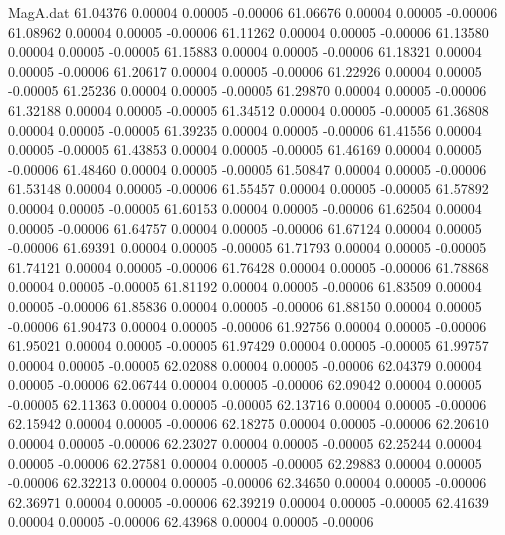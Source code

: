 \begin{filecontents}{MagA.dat}
  61.04376    0.00004    0.00005   -0.00006
  61.06676    0.00004    0.00005   -0.00006
  61.08962    0.00004    0.00005   -0.00006
  61.11262    0.00004    0.00005   -0.00006
  61.13580    0.00004    0.00005   -0.00005
  61.15883    0.00004    0.00005   -0.00006
  61.18321    0.00004    0.00005   -0.00006
  61.20617    0.00004    0.00005   -0.00006
  61.22926    0.00004    0.00005   -0.00005
  61.25236    0.00004    0.00005   -0.00005
  61.29870    0.00004    0.00005   -0.00006
  61.32188    0.00004    0.00005   -0.00005
  61.34512    0.00004    0.00005   -0.00005
  61.36808    0.00004    0.00005   -0.00005
  61.39235    0.00004    0.00005   -0.00006
  61.41556    0.00004    0.00005   -0.00005
  61.43853    0.00004    0.00005   -0.00005
  61.46169    0.00004    0.00005   -0.00006
  61.48460    0.00004    0.00005   -0.00005
  61.50847    0.00004    0.00005   -0.00006
  61.53148    0.00004    0.00005   -0.00006
  61.55457    0.00004    0.00005   -0.00005
  61.57892    0.00004    0.00005   -0.00005
  61.60153    0.00004    0.00005   -0.00006
  61.62504    0.00004    0.00005   -0.00006
  61.64757    0.00004    0.00005   -0.00006
  61.67124    0.00004    0.00005   -0.00006
  61.69391    0.00004    0.00005   -0.00005
  61.71793    0.00004    0.00005   -0.00005
  61.74121    0.00004    0.00005   -0.00006
  61.76428    0.00004    0.00005   -0.00006
  61.78868    0.00004    0.00005   -0.00005
  61.81192    0.00004    0.00005   -0.00006
  61.83509    0.00004    0.00005   -0.00006
  61.85836    0.00004    0.00005   -0.00006
  61.88150    0.00004    0.00005   -0.00006
  61.90473    0.00004    0.00005   -0.00006
  61.92756    0.00004    0.00005   -0.00006
  61.95021    0.00004    0.00005   -0.00005
  61.97429    0.00004    0.00005   -0.00005
  61.99757    0.00004    0.00005   -0.00005
  62.02088    0.00004    0.00005   -0.00006
  62.04379    0.00004    0.00005   -0.00006
  62.06744    0.00004    0.00005   -0.00006
  62.09042    0.00004    0.00005   -0.00005
  62.11363    0.00004    0.00005   -0.00005
  62.13716    0.00004    0.00005   -0.00006
  62.15942    0.00004    0.00005   -0.00006
  62.18275    0.00004    0.00005   -0.00006
  62.20610    0.00004    0.00005   -0.00006
  62.23027    0.00004    0.00005   -0.00005
  62.25244    0.00004    0.00005   -0.00006
  62.27581    0.00004    0.00005   -0.00005
  62.29883    0.00004    0.00005   -0.00006
  62.32213    0.00004    0.00005   -0.00006
  62.34650    0.00004    0.00005   -0.00006
  62.36971    0.00004    0.00005   -0.00006
  62.39219    0.00004    0.00005   -0.00005
  62.41639    0.00004    0.00005   -0.00006
  62.43968    0.00004    0.00005   -0.00006

\end{filecontents}
